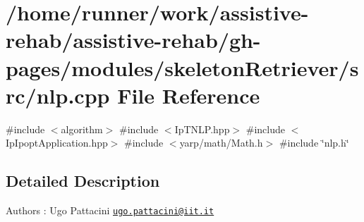 \section{/home/runner/work/assistive-\/rehab/assistive-\/rehab/gh-\/pages/modules/skeleton\+Retriever/src/nlp.cpp File Reference}
\label{nlp_8cpp}
{\ttfamily \#include $<$algorithm$>$}\newline
{\ttfamily \#include $<$Ip\+T\+N\+L\+P.\+hpp$>$}\newline
{\ttfamily \#include $<$Ip\+Ipopt\+Application.\+hpp$>$}\newline
{\ttfamily \#include $<$yarp/math/\+Math.\+h$>$}\newline
{\ttfamily \#include \char`\"{}nlp.\+h\char`\"{}}\newline


\subsection{Detailed Description}
\begin{DoxyAuthor}{Authors}
\+: Ugo Pattacini \href{mailto:ugo.pattacini@iit.it}{\tt ugo.\+pattacini@iit.\+it} 
\end{DoxyAuthor}

